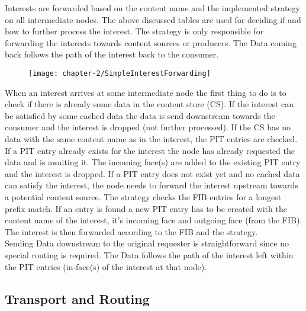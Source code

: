 Interests are forwarded based on the content name and the implemented strategy on all intermediate nodes. The above discussed tables are used for deciding if and how to further process the interest. The strategy is only responsible for forwarding the interests towards content sources or producers. The Data coming back follows the path of the interest back to the consumer.

\begin{figure}[H]
\texttt{[image: chapter-2/SimpleInterestForwarding]}
\centering
\end{figure}

When an interest arrives at some intermediate node the first thing to do is to check if there is already some data in the content store (CS). If the interest can be satisfied by some cached data the data is send downstream towards the consumer and the interest is dropped (not further processed). If the CS has no data with the same content name as in the interest, the PIT entries are checked. If a PIT entry already exists for the interest the node has already requested the data and is awaiting it. The incoming face(s) are added to the existing PIT entry and the interest is dropped. If a PIT entry does not exist yet and no cached data can satisfy the interest, the node needs to forward the interest upstream towards a potential content source. The strategy checks the FIB entries for a longest prefix match. If an entry is found a new PIT entry has to be created with the content name of the interest, it's incoming face and outgoing face (from the FIB). The interest is then forwarded according to the FIB and the strategy.
\\
Sending Data downstream to the original requester is straightforward since no special routing is required. The Data follows the path of the interest left within the PIT entries (in-face(s) of the interest at that node). 

\subsection{Transport and Routing}

